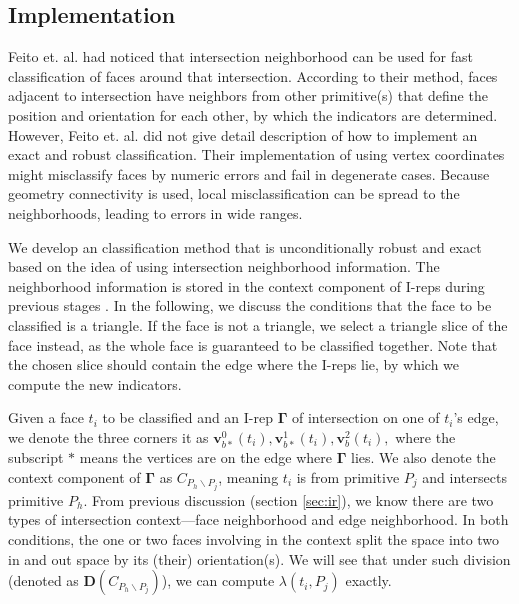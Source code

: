 \documentclass[10pt,journal,compsoc]{IEEEtran}
\begin{document}
\iffalse
\subsection{Implementation}

\label{sec:individual}

Feito et. al. \cite{feito2013fast} had noticed that intersection neighborhood can be used for fast classification of faces around that intersection. According to their method, faces adjacent to intersection have neighbors from other primitive(s) that define the position and orientation for each other, by which the indicators are determined. However, Feito et. al. did not give detail description of how to implement an exact and robust classification. Their implementation of using vertex coordinates might misclassify faces by numeric errors and fail in degenerate cases. Because geometry connectivity is used, local misclassification can be spread to the neighborhoods, leading to errors in wide ranges.

We develop an classification method that is unconditionally robust and exact based on the idea of using intersection neighborhood information. The neighborhood information is stored in the context component of I-reps during previous stages . In the following, we discuss the conditions that the face to be classified is a triangle. If the face is not a triangle, we select a triangle slice of the face instead, as the whole face is guaranteed to be classified together. Note that the chosen slice should contain the edge where the I-reps lie, by which we compute the new indicators.

Given a face $t_i$ to be classified and an I-rep $\boldsymbol\Gamma$ of intersection on one of $t_i$'s edge, we denote the three corners it as $\bm{v}_{b*}^{0}(t_i), \bm{v}_{b*}^{1}(t_i), \bm{v}_b^2(t_i),$ where the subscript $*$ means the vertices are on the edge where $\boldsymbol\Gamma$ lies. We also denote the context component of $\boldsymbol\Gamma$ as $C_{P_h \backslash P_j}$, meaning $t_i$ is from primitive $P_j$ and intersects primitive $P_h$. From previous discussion (section \ref{sec:ir}){\color{red}{may be more than one}}, we know there are two types of intersection context---face neighborhood and edge neighborhood. In both conditions, the one or two faces involving in the context split the space into two in and out space by its (their) orientation(s). We will see that under such division (denoted as $\boldsymbol{D}(C_{P_h \backslash P_j})$), we can compute $\lambda(t_i, P_j)$ exactly.
\end{document}

